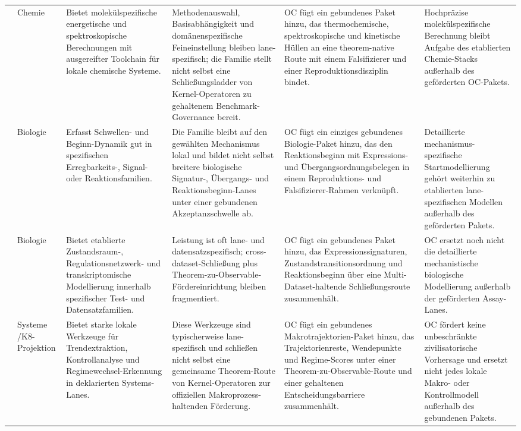 \begin{longtable}{@{}L{0.17\textwidth}L{0.09\textwidth}L{0.17\textwidth}L{0.17\textwidth}L{0.20\textwidth}L{0.14\textwidth}@{}}
 & Chemie & Bietet molekülspezifische energetische und spektroskopische Berechnungen mit ausgereifter Toolchain für lokale chemische Systeme. & Methodenauswahl, Basisabhängigkeit und domänenspezifische Feineinstellung bleiben lane-spezifisch; die Familie stellt nicht selbst eine Schließungsladder von Kernel-Operatoren zu gehaltenem Benchmark-Governance bereit. & OC fügt ein gebundenes Paket hinzu, das thermochemische, spektroskopische und kinetische Hüllen an eine theorem-native Route mit einem Falsifizierer und einer Reproduktionsdisziplin bindet. & Hochpräzise molekülspezifische Berechnung bleibt Aufgabe des etablierten Chemie-Stacks außerhalb des geförderten OC-Pakets. \\
 & Biologie & Erfasst Schwellen- und Beginn-Dynamik gut in spezifischen Erregbarkeits-, Signal- oder Reaktionsfamilien. & Die Familie bleibt auf den gewählten Mechanismus lokal und bildet nicht selbst breitere biologische Signatur-, Übergangs- und Reaktionsbeginn-Lanes unter einer gebundenen Akzeptanzschwelle ab. & OC fügt ein einziges gebundenes Biologie-Paket hinzu, das den Reaktionsbeginn mit Expressions- und Übergangsordnungsbelegen in einem Reproduktions- und Falsifizierer-Rahmen verknüpft. & Detaillierte mechanismus-spezifische Startmodellierung gehört weiterhin zu etablierten lane-spezifischen Modellen außerhalb des geförderten Pakets. \\
 & Biologie & Bietet etablierte Zustandsraum-, Regulationsnetzwerk- und transkriptomische Modellierung innerhalb spezifischer Test- und Datensatzfamilien. & Leistung ist oft lane- und datensatzspezifisch; cross-dataset-Schließung plus Theorem-zu-Observable-Fördereinrichtung bleiben fragmentiert. & OC fügt ein gebundenes Paket hinzu, das Expressionssignaturen, Zustandstransitionsordnung und Reaktionsbeginn über eine Multi-Dataset-haltende Schließungsroute zusammenhält. & OC ersetzt noch nicht die detaillierte mechanistische biologische Modellierung außerhalb der geförderten Assay-Lanes. \\
 & Systeme /\allowbreak K8-Projektion & Bietet starke lokale Werkzeuge für Trendextraktion, Kontrollanalyse und Regimewechsel-Erkennung in deklarierten Systems-Lanes. & Diese Werkzeuge sind typischerweise lane-spezifisch und schließen nicht selbst eine gemeinsame Theorem-Route von Kernel-Operatoren zur offiziellen Makroprozess-haltenden Förderung. & OC fügt ein gebundenes Makrotrajektorien-Paket hinzu, das Trajektorienreste, Wendepunkte und Regime-Scores unter einer Theorem-zu-Observable-Route und einer gehaltenen Entscheidungsbarriere zusammenhält. & OC fördert keine unbeschränkte zivilisatorische Vorhersage und ersetzt nicht jedes lokale Makro- oder Kontrollmodell außerhalb des gebundenen Pakets. \\

\end{longtable}
